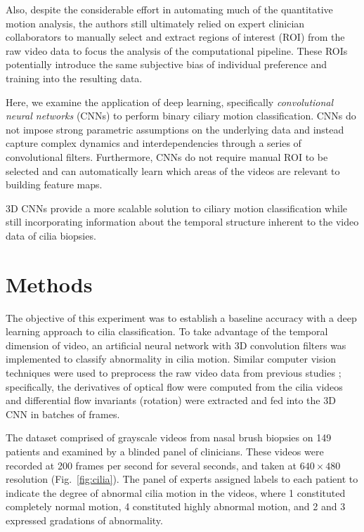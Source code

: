 Also, despite the considerable effort in automating much of the quantitative motion analysis, the authors still ultimately relied on expert clinician collaborators to manually select and extract regions of interest (ROI) from the raw video data to focus the analysis of the computational pipeline. These ROIs potentially introduce the same subjective bias of individual preference and training into the resulting data.

Here, we examine the application of deep learning, specifically \textit{convolutional neural networks} (CNNs) to perform binary ciliary motion classification. CNNs do not impose strong parametric assumptions on the underlying data and instead capture complex dynamics and interdependencies through a series of convolutional filters. Furthermore, CNNs do not require manual ROI to be selected and can automatically learn which areas of the videos are relevant to building feature maps.

3D CNNs provide a more scalable solution to ciliary motion classification while still incorporating information about the temporal structure inherent to the video data of cilia biopsies.

\section{Methods}

The objective of this experiment was to establish a baseline accuracy with a deep learning approach to cilia classification. To take advantage of the temporal dimension of video, an artificial neural network with 3D convolution filters was implemented to classify abnormality in cilia motion. Similar computer vision techniques were used to preprocess the raw video data from previous studies  \cite{quinn2011novel}; specifically, the derivatives of optical flow were computed from the cilia videos and differential flow invariants (rotation) were extracted and fed into the 3D CNN in batches of frames.

The dataset comprised of grayscale videos from nasal brush biopsies on 149 patients and examined by a blinded panel of clinicians. These videos were recorded at 200 frames per second for several seconds, and taken at $640 \times 480$ resolution (Fig.~\ref{fig:cilia}). The panel of experts assigned labels to each patient to indicate the degree of abnormal cilia motion in the videos, where 1 constituted completely normal motion, 4 constituted highly abnormal motion, and 2 and 3 expressed gradations of abnormality. 

